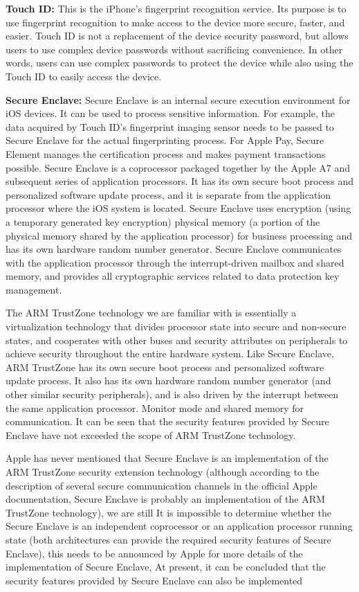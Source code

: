 \documentclass[journal]{IEEEtran}
\begin{document}
    \textbf{Touch ID:} This is the iPhone's fingerprint recognition service. Its purpose is to use fingerprint recognition to make access to the device more secure, faster, and easier. Touch ID is not a replacement of the device security password, but allows users to use complex device passwords without sacrificing convenience. In other words, users can use complex passwords to protect the device while also using the Touch ID to easily access the device.
   
    \textbf{Secure Enclave:} Secure Enclave is an internal secure execution environment for iOS devices. It can be used to process sensitive information. For example, the data acquired by Touch ID's fingerprint imaging sensor needs to be passed to Secure Enclave for the actual fingerprinting process. For Apple Pay, Secure Element manages the certification process and makes payment transactions possible.
    Secure Enclave is a coprocessor packaged together by the Apple A7 and subsequent series of application processors. It has its own secure boot process and personalized software update process, and it is separate from the application processor where the iOS system is located. Secure Enclave uses encryption (using a temporary generated key encryption) physical memory (a portion of the physical memory shared by the application processor) for business processing and has its own hardware random number generator. Secure Enclave communicates with the application processor through the interrupt-driven mailbox and shared memory, and provides all cryptographic services related to data protection key management.

The ARM TrustZone technology we are familiar with is essentially a virtualization technology that divides processor state into secure and non-secure states, and cooperates with other buses and security attributes on peripherals to achieve security throughout the entire hardware system. Like Secure Enclave, ARM TrustZone has its own secure boot process and personalized software update process. It also has its own hardware random number generator (and other similar security peripherals), and is also driven by the interrupt between the same application processor. Monitor mode and shared memory for communication. It can be seen that the security features provided by Secure Enclave have not exceeded the scope of ARM TrustZone technology.


Apple has never mentioned that Secure Enclave is an implementation of the ARM TrustZone security extension technology (although according to the description of several secure communication channels in the official Apple documentation, Secure Enclave is probably an implementation of the ARM TrustZone technology), we are still It is impossible to determine whether the Secure Enclave is an independent coprocessor or an application processor running state (both architectures can provide the required security features of Secure Enclave), this needs to be announced by Apple for more details of the implementation of Secure Enclave, At present, it can be concluded that the security features provided by Secure Enclave can also be implemented
\end{document}
